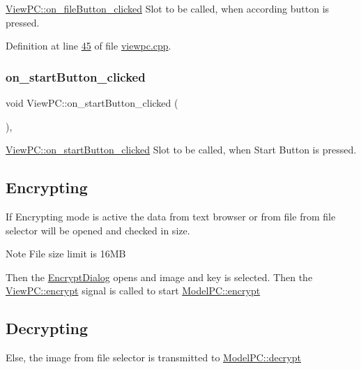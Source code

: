 \mbox{\hyperlink{class_view_p_c_a3b9b7a7be9702d8b160f257f1c74a776}{View\+P\+C\+::on\+\_\+file\+Button\+\_\+clicked}} Slot to be called, when according button is pressed. 



Definition at line \mbox{\hyperlink{viewpc_8cpp_source_l00045}{45}} of file \mbox{\hyperlink{viewpc_8cpp_source}{viewpc.\+cpp}}.

\mbox{\label{class_view_p_c_a456d75b7c5d3a089302a576e7359f1f4}} 
\subsubsection{\texorpdfstring{on\+\_\+start\+Button\+\_\+clicked}{on\_startButton\_clicked}}
{\footnotesize\ttfamily void View\+P\+C\+::on\+\_\+start\+Button\+\_\+clicked (\begin{DoxyParamCaption}{ }\end{DoxyParamCaption})\hspace{0.3cm}{\ttfamily [protected]}, {\ttfamily [slot]}}



\mbox{\hyperlink{class_view_p_c_a456d75b7c5d3a089302a576e7359f1f4}{View\+P\+C\+::on\+\_\+start\+Button\+\_\+clicked}} Slot to be called, when Start Button is pressed. 

\hypertarget{class_view_p_c_encrypting}{}\subsection{Encrypting}\label{class_view_p_c_encrypting}
If Encrypting mode is active the data from text browser or from file from file selector will be opened and checked in size. \begin{DoxyNote}{Note}
File size limit is 16\+MB
\end{DoxyNote}
Then the \mbox{\hyperlink{class_encrypt_dialog}{Encrypt\+Dialog}} opens and image and key is selected. Then the \mbox{\hyperlink{class_view_p_c_ade35449b95cf1c5424c4eb929f46fd73}{View\+P\+C\+::encrypt}} signal is called to start \mbox{\hyperlink{class_model_p_c_a8ef76567bc0c0307b4e2547c46536e51}{Model\+P\+C\+::encrypt}} \hypertarget{class_view_p_c_decrypting}{}\subsection{Decrypting}\label{class_view_p_c_decrypting}
Else, the image from file selector is transmitted to \mbox{\hyperlink{class_model_p_c_af1f0b21565bf39808c4cdd448fad0ea8}{Model\+P\+C\+::decrypt}} 

